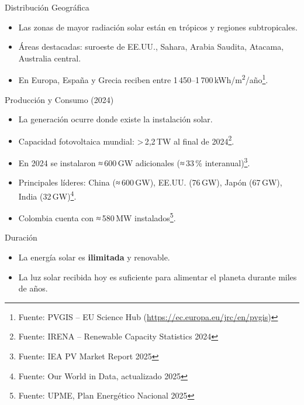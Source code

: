\documentclass[main.tex]{subfiles}
\begin{document}
\begin{frame}{Distribución Geográfica}
    \begin{itemize}
        \item Las zonas de mayor radiación solar están en trópicos y regiones subtropicales.
        \item Áreas destacadas: suroeste de EE.UU., Sahara, Arabia Saudita, Atacama, Australia central.
        \item En Europa, España y Grecia reciben entre 1 450–1 700 kWh/m\textsuperscript{2}/año\footnote{Fuente: PVGIS – EU Science Hub (\url{https://ec.europa.eu/jrc/en/pvgis})}.
    \end{itemize}
\end{frame}



\begin{frame}{Producción y Consumo (2024)}
    \begin{itemize}
        \item La generación ocurre donde existe la instalación solar.
        \item Capacidad fotovoltaica mundial: > 2,2 TW al final de 2024\footnote{Fuente: IRENA – Renewable Capacity Statistics 2024}.
        \item En 2024 se instalaron ≈ 600 GW adicionales (≈ 33 \% interanual)\footnote{Fuente: IEA PV Market Report 2025}.
        \item Principales líderes: China (≈ 600 GW), EE.UU. (76 GW), Japón (67 GW), India (32 GW)\footnote{Fuente: Our World in Data, actualizado 2025}.
        \item Colombia cuenta con ≈ 580 MW instalados\footnote{Fuente: UPME, Plan Energético Nacional 2025}.
    \end{itemize}
\end{frame}



\begin{frame}{Duración}
    \begin{itemize}
        \item La energía solar es \textbf{ilimitada} y renovable.
        \item La luz solar recibida hoy es suficiente para alimentar el planeta durante miles de años.
    \end{itemize}
\end{frame}
\end{document}

